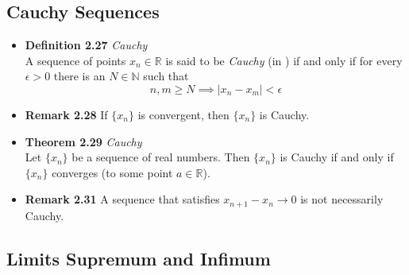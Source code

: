 \documentclass[11pt,a4paper]{article}
\begin{document}
\subsection{Cauchy Sequences}

\begin{itemize}
    \item \textbf{Definition 2.27} \emph{Cauchy} \\
        A sequence of points $x_n \in \mathbb{R}$ is said to be \emph{Cauchy} (in )
        if and only if for every $\epsilon > 0$ there is an $N \in \mathbb{N}$ such that
        \[
            n, m \geq N \implies |x_n - x_m| < \epsilon
        \]
    \item \textbf{Remark 2.28}
        If $\{x_n\}$ is convergent, then $\{x_n\}$ is Cauchy.
    \item \textbf{Theorem 2.29} \emph{Cauchy} \\
        Let $\{x_n\}$ be a sequence of real numbers.
        Then $\{x_n\}$ is Cauchy if and only if $\{x_n\}$ converges
        (to some point $a \in \mathbb{R}$).
    \item \textbf{Remark 2.31}
        A sequence that satisfies $x_{n+1} - x_n \to 0$ is not necessarily Cauchy.
\end{itemize}

\subsection{Limits Supremum and Infimum}
\end{document}

